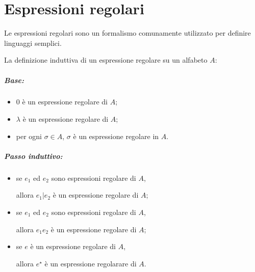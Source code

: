 \chapter{Espressioni regolari}
Le espressioni regolari sono un formalismo comunamente utilizzato per
definire linguaggi semplici.

\begin{theorem}
  La definizione induttiva di un espressione regolare su un alfabeto $A$:
  \paragraph{Base:}
  \begin{itemize}
    \item $0$ è un espressione regolare di $A$;
    \item $\lambda$ è un espressione regolare di $A$;
    \item per ogni $\sigma\in A$, $\sigma$ è un espressione regolare
      in $A$.
  \end{itemize}
  
  \paragraph{Passo induttivo:}
  \begin{itemize}
    \item se $e_1$ ed $e_2$ sono espressioni regolare di $A$,

      allora $e_1|e_2$ è un espressione regolare di $A$;
    \item se $e_1$ ed $e_2$ sono espressioni regolare di $A$,

      allora $e_1 e_2$ è un espressione regolare di $A$;
    \item se $e$ è un espressione regolare di $A$,

      allora $e^\star$ è un espressione regolarare di $A$.
  \end{itemize}
\end{theorem}
